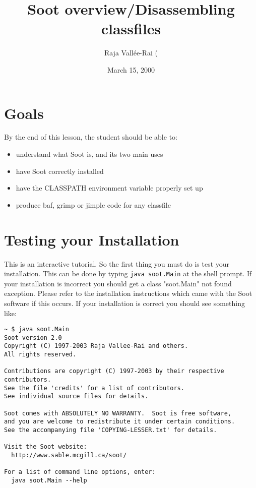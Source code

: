 \documentclass{article}
\title{Soot overview/Disassembling classfiles}
\author{Raja Vall\'ee-Rai (\htmladdnormallink{rvalleerai@sable.mcgill.ca)}{mailto:rvalleerai@sable.mcgill.ca}}
\date{March 15, 2000}
\begin{document}
\maketitle

\section{Goals}

By the end of this lesson, the student should be able to:
\begin{itemize}
\item understand what Soot is, and its two main uses
\item have Soot correctly installed
\item have the CLASSPATH environment variable properly set up
\item produce baf, grimp or jimple code for any classfile
\end{itemize}

\section{Testing your Installation}

This is an interactive tutorial.  So the first thing you must do is
test your installation.  This can be done by typing {\tt java
soot.Main} at the shell prompt.  If your installation is incorrect you
should get a class "soot.Main" not found exception.  Please refer to
the installation instructions which came with the Soot software if
this occurs.  If your installation is correct you should see something
like:

\begin{verbatim}
~ $ java soot.Main
Soot version 2.0
Copyright (C) 1997-2003 Raja Vallee-Rai and others.
All rights reserved.

Contributions are copyright (C) 1997-2003 by their respective contributors.
See the file 'credits' for a list of contributors.
See individual source files for details.

Soot comes with ABSOLUTELY NO WARRANTY.  Soot is free software,
and you are welcome to redistribute it under certain conditions.
See the accompanying file 'COPYING-LESSER.txt' for details.

Visit the Soot website:
  http://www.sable.mcgill.ca/soot/

For a list of command line options, enter:
  java soot.Main --help
\end{verbatim}
\end{document}
